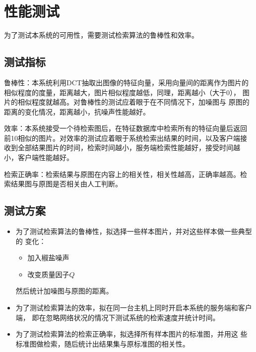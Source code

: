 
\newcommand{\insimg}[1] {
  \begin{subfigure}[b]{0.2\textwidth}
    \centering
    \texttt{[image: images/\#1]}
  \end{subfigure}
}

\chapter{性能测试}
\label{chap:benchmark}

为了测试本系统的可用性，需要测试检索算法的鲁棒性和效率。

\section{测试指标}
\label{sec:benchmark-index}
鲁棒性：本系统利用DCT抽取出图像的特征向量，采用向量间的距离作为图片的
相似程度的度量，距离越大，图片相似程度越低，同理，距离越小（大于0），
图片的相似程度就越高。对鲁棒性的测试应着眼于在不同情况下，加噪图与
原图的距离的变化情况，距离越小，抗噪声性能越好。

效率：本系统接受一个待检索图后，在特征数据库中检索所有的特征向量后返回
前10相似的图片。对效率的测试应着眼于系统检索出结果的时间，以及客户端接
收到全部结果图片的时间，检索时间越小，服务端检索性能越好，接受时间越
小，客户端性能越好。

检索正确率：检索结果与原图在内容上的相关性，相关性越高，正确率越高。检
索结果图与原图是否相关由人工判断。

\section{测试方案}
\label{sec:benchmark-scheme}

\begin{itemize}
\item 为了测试检索算法的鲁棒性，拟选择一些样本图片，并对这些样本做一些典型的
变化：
\begin{itemize}
\item 加入椒盐噪声
\item 改变质量因子$Q$
\end{itemize}
然后统计加噪图与原图的距离。

\item 为了测试检索算法的效率，拟在同一台主机上同时开启本系统的服务端和客户端，
即在忽略网络状况的情况下测试系统的检索速度并统计时间。

\item 为了测试检索算法的检索正确率，拟选择所有样本图片的标准图，并用这
  些标准图做检索，随后统计出结果集与原标准图的相关性。
\end{itemize}

